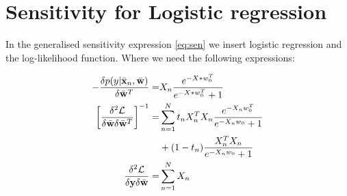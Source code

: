 \section{Sensitivity for Logistic regression}

In the generalised sensitivity expression \eqref{eq:sen} we insert logistic regression and the log-likelihood function. Where we need the following expressions:

\begin{align*}
- \frac{\delta p(y|\bar{{\bf x}}_n,\bar{{\bf w}})}{\delta \bar{{\bf w}}^T}=&
X_n\frac{e^{-X*w_0^T}}{e^{-X*w_0^T}+1}\\
 \left[ \frac{\delta^2 \mathcal{L}}{\delta \bar{{\bf w}} \delta \bar{{\bf w}}^T} \right]^{-1}=&
 \sum_{n=1}^{N}  t_n X_n^T X_n \frac{e^{-X_n w_0^T}}{e^{-X_nw_0}+1}\\&+(1-t_n) \frac{X_n^T X_n}{e^{-X_nw_0}+1}\\
 \frac{\delta^2 \mathcal{L}}{\delta {\bf y} \delta \bar{{\bf w}}}=& \sum_{n=1}^{N} X_n
\end{align*}



